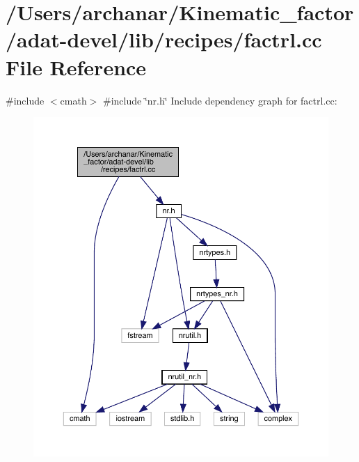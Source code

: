 \hypertarget{adat-devel_2lib_2recipes_2factrl_8cc}{}\section{/\+Users/archanar/\+Kinematic\+\_\+factor/adat-\/devel/lib/recipes/factrl.cc File Reference}
\label{adat-devel_2lib_2recipes_2factrl_8cc}
{\ttfamily \#include $<$cmath$>$}\newline
{\ttfamily \#include \char`\"{}nr.\+h\char`\"{}}\newline
Include dependency graph for factrl.\+cc\+:
\nopagebreak
\begin{figure}[H]
\begin{center}
\leavevmode
\includegraphics[width=350pt]{da/d3d/adat-devel_2lib_2recipes_2factrl_8cc__incl}
\end{center}
\end{figure}
